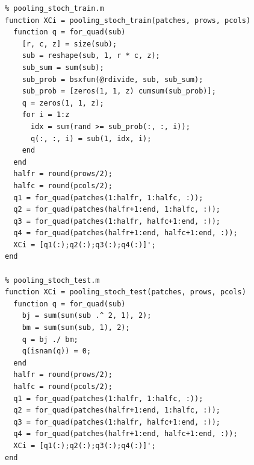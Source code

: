 \documentclass[a4paper,9pt]{article}
\begin{document}
\begin{lstlisting}
% pooling_stoch_train.m
function XCi = pooling_stoch_train(patches, prows, pcols)
  function q = for_quad(sub)
    [r, c, z] = size(sub);
    sub = reshape(sub, 1, r * c, z);
    sub_sum = sum(sub);
    sub_prob = bsxfun(@rdivide, sub, sub_sum);
    sub_prob = [zeros(1, 1, z) cumsum(sub_prob)];
    q = zeros(1, 1, z);
    for i = 1:z
      idx = sum(rand >= sub_prob(:, :, i));
      q(:, :, i) = sub(1, idx, i);
    end
  end
  halfr = round(prows/2);
  halfc = round(pcols/2);
  q1 = for_quad(patches(1:halfr, 1:halfc, :));
  q2 = for_quad(patches(halfr+1:end, 1:halfc, :));
  q3 = for_quad(patches(1:halfr, halfc+1:end, :));
  q4 = for_quad(patches(halfr+1:end, halfc+1:end, :));
  XCi = [q1(:);q2(:);q3(:);q4(:)]';
end

% pooling_stoch_test.m
function XCi = pooling_stoch_test(patches, prows, pcols)
  function q = for_quad(sub)
    bj = sum(sum(sub .^ 2, 1), 2);
    bm = sum(sum(sub, 1), 2);
    q = bj ./ bm;
    q(isnan(q)) = 0;
  end
  halfr = round(prows/2);
  halfc = round(pcols/2);
  q1 = for_quad(patches(1:halfr, 1:halfc, :));
  q2 = for_quad(patches(halfr+1:end, 1:halfc, :));
  q3 = for_quad(patches(1:halfr, halfc+1:end, :));
  q4 = for_quad(patches(halfr+1:end, halfc+1:end, :));
  XCi = [q1(:);q2(:);q3(:);q4(:)]';
end
\end{lstlisting}
\end{document}
